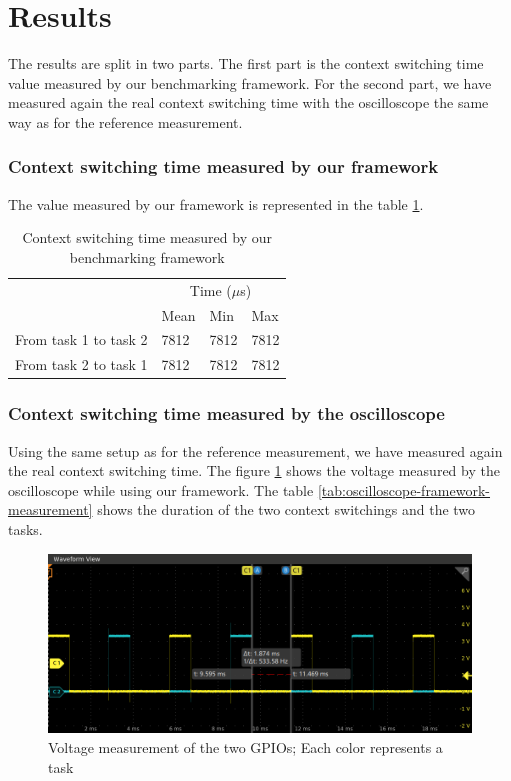 \section{Results}

The results are split in two parts.
The first part is the context switching time value measured by our benchmarking framework.
For the second part, we have measured again the real context switching time with the oscilloscope the same way as for the reference measurement.

\subsubsection{Context switching time measured by our framework} 
The value measured by our framework is represented in the table \ref{tab:framework-measurement}.

\begin{table}[!ht]
  \centering
  \begin{tabular}{llll}
                        & \multicolumn{3}{c}{Time ($\mu$s)}          \\ \cline{2-4} 
                        & \multicolumn{1}{c}{Mean} & Min  & Max  \\ \cline{2-4} 
  From task 1 to task 2 & 7812                     & 7812 & 7812 \\
  From task 2 to task 1 & 7812                     & 7812 & 7812
  \end{tabular}
  \caption{Context switching time measured by our benchmarking framework}
  \label{tab:framework-measurement}
  \end{table}

\subsubsection{Context switching time measured by the oscilloscope}
Using the same setup as for the reference measurement, we have measured again the real context switching time.
The figure \ref{fig:framework-value-wave} shows the voltage measured by the oscilloscope while using our framework.
The table \ref{tab:oscilloscope-framework-measurement} shows the duration of the two context switchings and the two tasks.

\begin{figure}[!ht]
  \centering
  \includegraphics[scale=0.5]{assets/framework-value-wave.png}
  \caption{\label{fig:framework-value-wave}Voltage measurement of the two GPIOs; Each color represents a task}
\end{figure}

